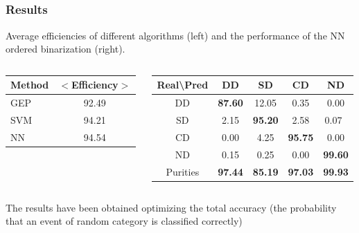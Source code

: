 \documentclass[hyperref={pdfpagelabels=false}]{beamer}
\begin{document}
\subsection{}
\frame
{
  \frametitle{Results}

Average efficiencies of different algorithms (left) and the performance of the NN ordered binarization (right). 

\begin{columns}
\begin{column}{4cm}

{\scriptsize
\begin{table}
\hspace{1.0cm}
\begin{tabular}{l|c}
Method & $<$Efficiency$>$ \\ \hline
GEP & 92.49 \\
SVM & 94.21 \\
NN & 94.54 \\
\end{tabular}
\end{table}
}
\end{column}
\begin{column}{7cm}

\hspace{2.2cm}
{\scriptsize
\begin{table}
\begin{tabular}{c|cccc}
  Real\textbackslash Pred & DD & SD & CD & ND \\ \hline
  DD & {\bf 87.60} & 12.05 & 0.35 & 0.00 \\
  SD & 2.15 & {\bf 95.20} & 2.58 & 0.07 \\
  CD & 0.00 & 4.25 & {\bf 95.75} & 0.00 \\
  ND & 0.15 & 0.25 & 0.00 & {\bf 99.60} \\ \hline
  Purities &  {\bf 97.44} & {\bf 85.19} & {\bf 97.03} & {\bf 99.93}
\end{tabular}
\end{table}
}
\end{column}

\end{columns}

The results have been obtained optimizing the total accuracy
(the probability that an event of random category is classified correctly)
}
\end{document}
